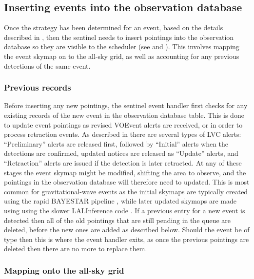 \subsection{Inserting events into the observation database}
\label{sec:event_insert}
\begin{colsection}

Once the strategy has been determined for an event, based on the details described in , then the sentinel needs to insert pointings into the observation database so they are visible to the scheduler (see  and ). This involves mapping the event skymap on to the all-sky grid, as well as accounting for any previous detections of the same event.

\subsubsection{Previous records}

Before inserting any new pointings, the sentinel event handler first checks for any existing records of the new event in the observation database  table. This is done to update event pointings as revised VOEvent alerts are received, or in order to process retraction events. As described in  there are several types of LVC alerts: ``Preliminary'' alerts are released first, followed by ``Initial'' alerts when the detections are confirmed, updated notices are released as ``Update'' alerts, and ``Retraction'' alerts are issued if the detection is later retracted. At any of these stages the event skymap might be modified, shifting the area to observe, and the pointings in the observation database will therefore need to updated. This is most common for gravitational-wave events as the initial skymaps are typically created using the rapid BAYESTAR pipeline \citep{BAYESTAR}, while later updated skymaps are made using using the slower LALInference code \citep{LALInference}. If a previous entry for a new event is detected then all of the old pointings that are still pending in the queue are deleted, before the new ones are added as described below. Should the event be of type  then this is where the event handler exits, as once the previous pointings are deleted then there are no more to replace them.

\subsubsection{Mapping onto the all-sky grid}


\end{colsection}
